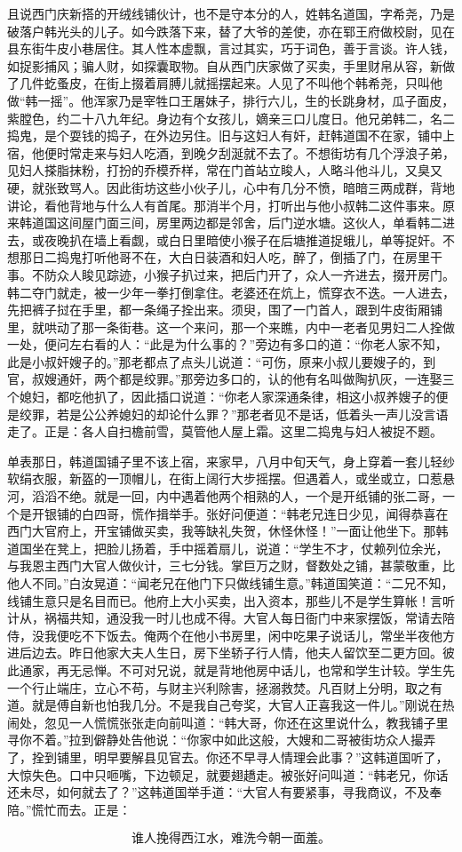 且说西门庆新搭的开绒线铺伙计，也不是守本分的人，姓韩名道国，字希尧，乃是破落户韩光头的儿子。如今跌落下来，替了大爷的差使，亦在郓王府做校尉，见在县东街牛皮小巷居住。其人性本虚飘，言过其实，巧于词色，善于言谈。许人钱，如捉影捕风；骗人财，如探囊取物。自从西门庆家做了买卖，手里财帛从容，新做了几件虼蚤皮，在街上掇着肩膊儿就摇摆起来。人见了不叫他个韩希尧，只叫他做“韩一摇”。他浑家乃是宰牲口王屠妹子，排行六儿，生的长跳身材，瓜子面皮，紫膛色，约二十八九年纪。身边有个女孩儿，嫡亲三口儿度日。他兄弟韩二，名二捣鬼，是个耍钱的捣子，在外边另住。旧与这妇人有奸，赶韩道国不在家，铺中上宿，他便时常走来与妇人吃酒，到晚夕刮涎就不去了。不想街坊有几个浮浪子弟，见妇人搽脂抹粉，打扮的乔模乔样，常在门首站立睃人，人略斗他斗儿，又臭又硬，就张致骂人。因此街坊这些小伙子儿，心中有几分不愤，暗暗三两成群，背地讲论，看他背地与什么人有首尾。那消半个月，打听出与他小叔韩二这件事来。原来韩道国这间屋门面三间，房里两边都是邻舍，后门逆水塘。这伙人，单看韩二进去，或夜晚扒在墙上看觑，或白日里暗使小猴子在后塘推道捉蛾儿，单等捉奸。不想那日二捣鬼打听他哥不在，大白日装酒和妇人吃，醉了，倒插了门，在房里干事。不防众人睃见踪迹，小猴子扒过来，把后门开了，众人一齐进去，掇开房门。韩二夺门就走，被一少年一拳打倒拿住。老婆还在炕上，慌穿衣不迭。一人进去，先把裤子挝在手里，都一条绳子拴出来。须臾，围了一门首人，跟到牛皮街厢铺里，就哄动了那一条街巷。这一个来问，那一个来瞧，内中一老者见男妇二人拴做一处，便问左右看的人：“此是为什么事的？”旁边有多口的道：“你老人家不知，此是小叔奸嫂子的。”那老都点了点头儿说道：“可伤，原来小叔儿要嫂子的，到官，叔嫂通奸，两个都是绞罪。”那旁边多口的，认的他有名叫做陶扒灰，一连娶三个媳妇，都吃他扒了，因此插口说道：“你老人家深通条律，相这小叔养嫂子的便是绞罪，若是公公养媳妇的却论什么罪？”那老者见不是话，低着头一声儿没言语走了。正是：各人自扫檐前雪，莫管他人屋上霜。这里二捣鬼与妇人被捉不题。

单表那日，韩道国铺子里不该上宿，来家早，八月中旬天气，身上穿着一套儿轻纱软绢衣服，新盔的一顶帽儿，在街上阔行大步摇摆。但遇着人，或坐或立，口惹悬河，滔滔不绝。就是一回，内中遇着他两个相熟的人，一个是开纸铺的张二哥，一个是开银铺的白四哥，慌作揖举手。张好问便道：“韩老兄连日少见，闻得恭喜在西门大官府上，开宝铺做买卖，我等缺礼失贺，休怪休怪！”一面让他坐下。那韩道国坐在凳上，把脸儿扬着，手中摇着扇儿，说道：“学生不才，仗赖列位余光，与我恩主西门大官人做伙计，三七分钱。掌巨万之财，督数处之铺，甚蒙敬重，比他人不同。”白汝晃道：“闻老兄在他门下只做线铺生意。”韩道国笑道：“二兄不知，线铺生意只是名目而已。他府上大小买卖，出入资本，那些儿不是学生算帐！言听计从，祸福共知，通没我一时儿也成不得。大官人每日衙门中来家摆饭，常请去陪侍，没我便吃不下饭去。俺两个在他小书房里，闲中吃果子说话儿，常坐半夜他方进后边去。昨日他家大夫人生日，房下坐轿子行人情，他夫人留饮至二更方回。彼此通家，再无忌惮。不可对兄说，就是背地他房中话儿，也常和学生计较。学生先一个行止端庄，立心不苟，与财主兴利除害，拯溺救焚。凡百财上分明，取之有道。就是傅自新也怕我几分。不是我自己夸奖，大官人正喜我这一件儿。”刚说在热闹处，忽见一人慌慌张张走向前叫道：“韩大哥，你还在这里说什么，教我铺子里寻你不着。”拉到僻静处告他说：“你家中如此这般，大嫂和二哥被街坊众人撮弄了，拴到铺里，明早要解县见官去。你还不早寻人情理会此事？”这韩道国听了，大惊失色。口中只咂嘴，下边顿足，就要翅趫走。被张好问叫道：“韩老兄，你话还未尽，如何就去了？”这韩道国举手道：“大官人有要紧事，寻我商议，不及奉陪。”慌忙而去。正是：

\[
谁人挽得西江水，难洗今朝一面羞。
\]
